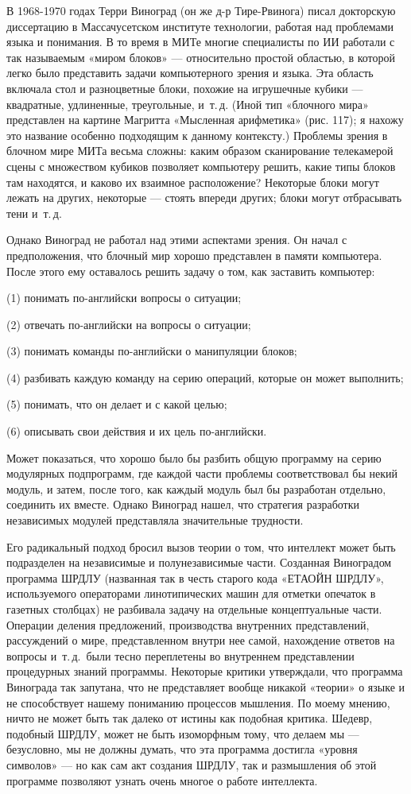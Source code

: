 \documentclass[../main.tex]{subfiles}
\begin{document}
В 1968-1970 годах Терри Виноград (он же д-р Тире-Рвинога) писал докторскую диссертацию в Массачусетском институте технологии, работая над проблемами языка и понимания. В то время в МИТе многие специалисты по ИИ работали с так называемым «миром блоков» --- относительно простой областью, в которой легко было представить задачи компьютерного зрения и языка. Эта область включала стол и разноцветные блоки, похожие на игрушечные кубики --- квадратные, удлиненные, треугольные, и~т.\,д. (Иной тип «блочного мира» представлен на картине Магритта «Мысленная арифметика» (рис. 117); я нахожу это название особенно подходящим к данному контексту.) Проблемы зрения в блочном мире МИТа весьма сложны: каким образом сканирование телекамерой сцены с множеством кубиков позволяет компьютеру решить, какие типы блоков там находятся, и каково их взаимное расположение? Некоторые блоки могут лежать на других, некоторые --- стоять впереди других; блоки могут отбрасывать тени и~т.\,д.

Однако Виноград не работал над этими аспектами зрения. Он начал с предположения, что блочный мир хорошо представлен в памяти компьютера. После этого ему оставалось решить задачу о том, как заставить компьютер:

(1) понимать по-английски вопросы о ситуации;

(2) отвечать по-английски на вопросы о ситуации;

(3) понимать команды по-английски о манипуляции блоков;

(4) разбивать каждую команду на серию операций, которые он может выполнить;

(5) понимать, что он делает и с какой целью;

(6) описывать свои действия и их цель по-английски.

Может показаться, что хорошо было бы разбить общую программу на серию модулярных подпрограмм, где каждой части проблемы соответствовал бы некий модуль, и затем, после того, как каждый модуль был бы разработан отдельно, соединить их вместе. Однако Виноград нашел, что стратегия разработки независимых модулей представляла значительные трудности.

Его радикальный подход бросил вызов теории о том, что интеллект может быть подразделен на независимые и полунезависимые части. Созданная Виноградом программа ШРДЛУ (названная так в честь старого кода «ЕТАОЙН ШРДЛУ», используемого операторами линотипических машин для отметки опечаток в газетных столбцах) не разбивала задачу на отдельные концептуальные части. Операции деления предложений, производства внутренних представлений, рассуждений о мире, представленном внутри нее самой, нахождение ответов на вопросы и~т.\,д.\ были тесно переплетены во внутреннем представлении процедурных знаний программы. Некоторые критики утверждали, что программа Винограда так запутана, что не представляет вообще никакой «теории» о языке и не способствует нашему пониманию процессов мышления. По моему мнению, ничто не может быть так далеко от истины как подобная критика. Шедевр, подобный ШРДЛУ, может не быть изоморфным тому, что делаем мы --- безусловно, мы не должны думать, что эта программа достигла «уровня символов» --- но как сам акт создания ШРДЛУ, так и размышления об этой программе позволяют узнать очень многое о работе интеллекта.
\end{document}
